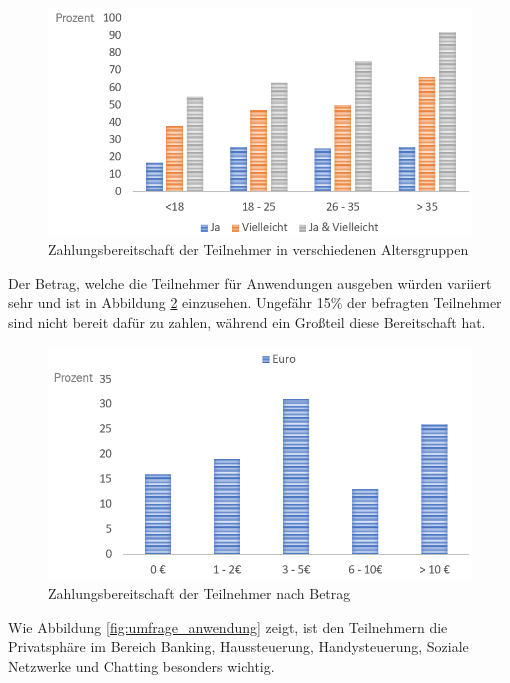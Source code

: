 \begin{figure}[h]
	\centering
	\includegraphics[width=0.9\linewidth]{Picture/umfrage_geld_gruppen}
	\caption[Zahlungsbereitschaft der Teilnehmer in verschiedenen Altersgruppen]{Zahlungsbereitschaft der Teilnehmer in verschiedenen Altersgruppen}
	\label{fig:umfrage_geld_gruppen}
\end{figure}

Der Betrag, welche die Teilnehmer für Anwendungen ausgeben würden variiert sehr und ist in Abbildung \ref{fig:umfrage_betrag} einzusehen. Ungefähr 15\% der befragten Teilnehmer sind nicht bereit dafür zu zahlen, während ein Großteil diese Bereitschaft hat.

\begin{figure}[h]
	\centering
	\includegraphics[width=0.9\linewidth]{Picture/umfrage_betrag}
	\caption[Zahlungsbereitschaft der Teilnehmer nach Betrag]{Zahlungsbereitschaft der Teilnehmer nach Betrag}
	\label{fig:umfrage_betrag}
\end{figure}

Wie Abbildung \ref{fig:umfrage_anwendung} zeigt, ist den Teilnehmern die Privatsphäre im Bereich Banking, Haussteuerung, Handysteuerung, Soziale Netzwerke und Chatting besonders wichtig.

